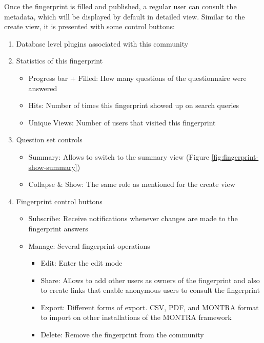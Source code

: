 Once the fingerprint is filled and published, a regular user can consult the metadata, which will be displayed by default in detailed view.
Similar to the create view, it is presented with some control buttons:

\begin{enumerate}
    \item Database level plugins associated with this community
    \item Statistics of this fingerprint
        \begin{itemize}
            \item Progress bar + Filled: How many questions of the questionnaire were answered
            \item Hits: Number of times this fingerprint showed up on search queries
            \item Unique Views: Number of users that visited this fingerprint
        \end{itemize}
    \item Question set controls
        \begin{itemize}
            \item Summary: Allows to switch to the summary view (Figure \ref{fig:fingerprint-show-summary})
            \item Collapse \& Show: The same role as mentioned for the create view
        \end{itemize}
    \item Fingerprint control buttons
        \begin{itemize}
            \item Subscribe: Receive notifications whenever changes are made to the fingerprint answers
            \item Manage: Several fingerprint operations
                \begin{itemize}
                    \item Edit: Enter the edit mode
                    \item Share: Allows to add other users as owners of the fingerprint and also to create links that enable anonymous users to consult the fingerprint
                    \item Export: Different forms of export. CSV, PDF, and MONTRA format to import on other installations of the MONTRA framework
                    \item Delete: Remove the fingerprint from the community
                \end{itemize}
        \end{itemize}
\end{enumerate}

